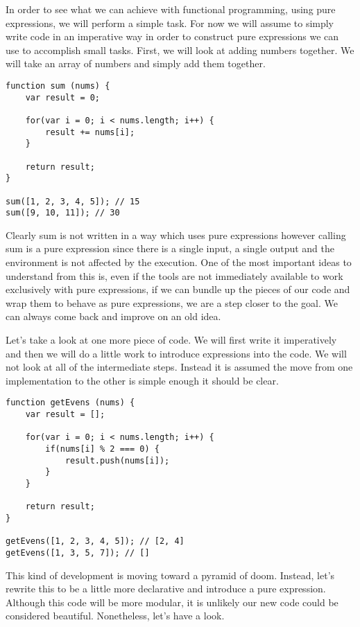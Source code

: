 \documentclass[a4paper,12pt,twoside]{book}
\begin{document}
 In order to see what we can achieve with functional programming, using pure expressions, we will perform a simple task. For now we will assume to simply write code in an imperative way in order to construct pure expressions we can use to accomplish small tasks. First, we will look at adding numbers together. We will take an array of numbers and simply add them together.
 
\begin{lstlisting}
function sum (nums) {
    var result = 0;
    
    for(var i = 0; i < nums.length; i++) {
        result += nums[i];
    }
    
    return result;
}

sum([1, 2, 3, 4, 5]); // 15
sum([9, 10, 11]); // 30
\end{lstlisting}
 
 Clearly sum is not written in a way which uses pure expressions however calling sum is a pure expression since there is a single input, a single output and the environment is not affected by the execution. One of the most important ideas to understand from this is, even if the tools are not immediately available to work exclusively with pure expressions, if we can bundle up the pieces of our code and wrap them to behave as pure expressions, we are a step closer to the goal. We can always come back and improve on an old idea.
 
 Let's take a look at one more piece of code. We will first write it imperatively and then we will do a little work to introduce expressions into the code. We will not look at all of the intermediate steps. Instead it is assumed the move from one implementation to the other is simple enough it should be clear.
 
\begin{lstlisting}
function getEvens (nums) {
    var result = [];
    
    for(var i = 0; i < nums.length; i++) {
        if(nums[i] % 2 === 0) {
            result.push(nums[i]);        
        }    
    }
    
    return result;
}

getEvens([1, 2, 3, 4, 5]); // [2, 4]
getEvens([1, 3, 5, 7]); // []
\end{lstlisting}

 This kind of development is moving toward a pyramid of doom. Instead, let's rewrite this to be a little more declarative and introduce a pure expression. Although this code will be more modular, it is unlikely our new code could be considered beautiful. Nonetheless, let's have a look.
 
\end{document}
